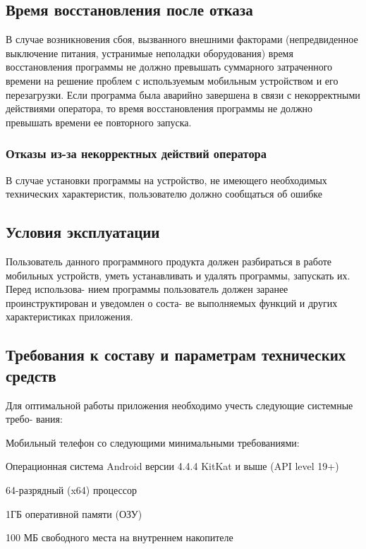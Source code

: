 \subsection{Время восстановления после отказа} 
В случае возникновения сбоя, вызванного внешними факторами (непредвиденное
выключение питания, устранимые неполадки оборудования) время восстановления
программы не должно превышать суммарного затраченного времени на решение
проблем с используемым мобильным устройством и его перезагрузки. Если программа
была аварийно завершена в связи с некорректными действиями оператора, то время
восстановления программы не должно превышать времени ее повторного запуска.


\subsubsection{Отказы из-за некорректных действий оператора}
В случае установки программы на устройство, не имеющего необходимых технических
характеристик, пользователю должно сообщаться об ошибке


\subsection{Условия эксплуатации}
Пользователь данного программного продукта должен разбираться в работе мобильных
устройств, уметь устанавливать и удалять программы, запускать их. Перед использова-
нием программы пользователь должен заранее проинструктирован и уведомлен о соста-
ве выполняемых функций и других характеристиках приложения.

\subsection{Требования к составу и параметрам технических средств}
Для оптимальной работы приложения необходимо учесть следующие системные требо-
вания:
\begin{my_enumerate}
    \item Мобильный телефон со следующими минимальными требованиями:
        \begin{my_enumerate}
            \item Операционная система Android версии 4.4.4 KitKat и выше (API level 19+)
            \item 64-разрядный (x64) процессор
            \item 1ГБ оперативной памяти (ОЗУ)
            \item 100 МБ свободного места на внутреннем накопителе
        \end{my_enumerate}
\end{my_enumerate}

